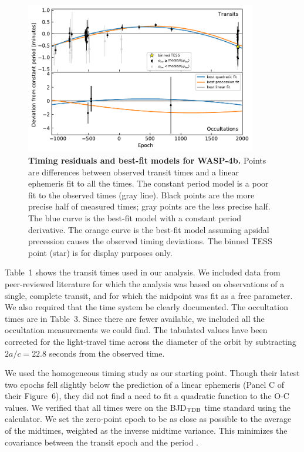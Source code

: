 \documentclass[12pt,twocolumn,tighten]{aastex62}
\begin{document}
\begin{figure}[t]
    \begin{center}
        \leavevmode
        \includegraphics[width=0.9\textwidth]{f3.pdf}
    \end{center}
    \vspace{-0.5cm}
    \caption{
        {\bf Timing residuals and best-fit models for WASP-4b.}
        Points are differences between observed transit times and a
        linear ephemeris fit to all the times.  The constant period
        model is a poor fit to the observed times (gray line).  Black
        points are the more precise half of measured times; gray
        points are the less precise half.  The blue curve is the
        best-fit model with a constant period derivative.  The orange
        curve is the best-fit model assuming apsidal precession causes
        the observed timing deviations. The binned TESS point (star)
        is for display purposes only.
        \label{fig:times}
    }
\end{figure}

Table~1 shows the transit times used in our analysis.  We included
data from peer-reviewed literature for which the analysis was based on
observations of a single, complete transit, and for which the midpoint
was fit as a free parameter. We also required that the time system be
clearly documented.  The occultation times are in Table~3.  Since
there are fewer available, we included all the occultation
measurements we could find. The tabulated values have been corrected
for the light-travel time across the diameter of the orbit by
subtracting $2a/c = 22.8$ seconds from the observed time.

We used the homogeneous \citet{hoyer_tramos_2013} timing study as our
starting point.  Though their latest two epochs fell slightly below
the prediction of a linear ephemeris (Panel C of their Figure~6), they
did not find a need to fit a quadratic function to the O-C values.  We
verified that all times were on the BJD$_{\rm TDB}$ time standard
using the \citet{eastman_achieving_2010} calculator.  We set the
zero-point epoch to be as close as possible to the average of the
midtimes, weighted as the inverse midtime variance. This minimizes the
covariance between the transit epoch and the period
\citep{gibson_gemini_2013}.
\end{document}
